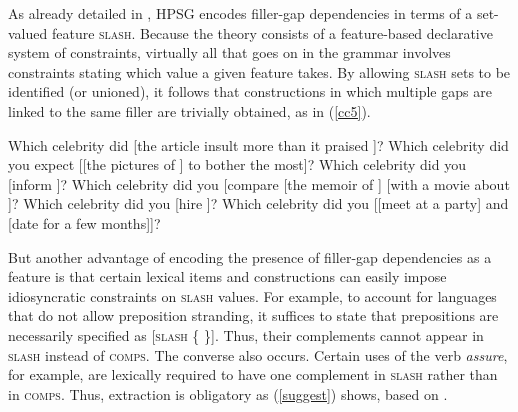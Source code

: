 \documentclass[output=paper,biblatex,babelshorthands,newtxmath,draftmode,colorlinks,citecolor=brown]{langscibook}
\begin{document}
As already detailed in , HPSG encodes filler-gap dependencies in terms of a
set-valued feature \textsc{slash}. Because the theory consists of a feature-based declarative system of
constraints, virtually all that goes on in the grammar involves constraints stating which value a
given feature takes. By allowing \textsc{slash} sets to be identified (or unioned), it
follows that constructions in which multiple gaps are linked to the same filler are trivially
obtained, as in (\ref{cc5}).

\eal
\label{cc5}
\ex Which celebrity did  [the article insult \spc more than it praised \spc]?
\ex Which celebrity  did you expect [[the pictures of \spc ] to bother \spc the most]?
\ex Which celebrity did you [inform ]?
\ex Which celebrity did you [compare [the memoir of \spc] [with a movie about \spc]?
\ex Which celebrity  did you [hire ]?
\ex Which celebrity  did you [[meet \spcs at a party] and [date \spcs for a few months]]?
\zl 

But another advantage of encoding the presence of filler-gap dependencies as a feature is that
certain lexical items and constructions can easily impose idiosyncratic constraints on \textsc{slash}
values. For example, to account for  languages that do not allow preposition stranding,
it suffices to state that prepositions are necessarily specified as [\textsc{slash} \{ \}]. Thus,
their complements cannot appear in \textsc{slash} instead of \textsc{comps}. 
The converse also occurs. Certain uses of the verb \emph{assure}, for example, 
are lexically required to have one complement in \textsc{slash} rather than in \textsc{comps}. Thus,
extraction is obligatory as (\ref{suggest}) shows, based on .
   
\eal \label{suggest}   




\zl
\end{document}
